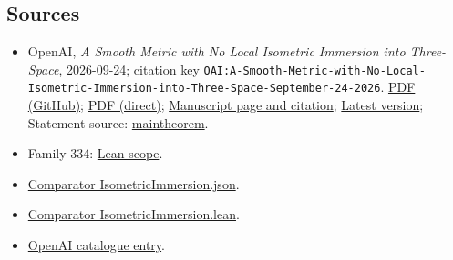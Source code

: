 \documentclass[11pt]{article}
\begin{document}
\subsection{Sources}
\begin{itemize}
\item OpenAI, \emph{A Smooth Metric with No Local Isometric Immersion into Three-Space}, 2026-09-24; citation key \texttt{OAI:A-Smooth-Metric-with-No-Local-Isometric-Immersion-into-Three-Space-September-24-2026}. \href{https://github.com/openai/math/blob/adc7f1241b42e322a6451854ab7e4b4c146bf78a/preprints/A-Smooth-Metric-with-No-Local-Isometric-Immersion-into-Three-Space-September-24-2026/paper.pdf}{PDF (GitHub)}; \href{https://github.com/openai/math/raw/adc7f1241b42e322a6451854ab7e4b4c146bf78a/preprints/A-Smooth-Metric-with-No-Local-Isometric-Immersion-into-Three-Space-September-24-2026/paper.pdf}{PDF (direct)}; \href{https://github.com/openai/math/blob/adc7f1241b42e322a6451854ab7e4b4c146bf78a/preprints/A-Smooth-Metric-with-No-Local-Isometric-Immersion-into-Three-Space-September-24-2026/README.md}{Manuscript page and citation}; \href{https://github.com/openai/math/blob/main/preprints/A-Smooth-Metric-with-No-Local-Isometric-Immersion-into-Three-Space-September-24-2026/paper.pdf}{Latest version}; Statement source: \href{https://github.com/openai/math/blob/adc7f1241b42e322a6451854ab7e4b4c146bf78a/preprints/A-Smooth-Metric-with-No-Local-Isometric-Immersion-into-Three-Space-September-24-2026/build/main.tex\#L70}{maintheorem}.
\item Family 334: \href{https://github.com/openai/math/blob/adc7f1241b42e322a6451854ab7e4b4c146bf78a/lean/docs/334.md}{Lean scope}.
\item \href{https://github.com/openai/math/blob/adc7f1241b42e322a6451854ab7e4b4c146bf78a/lean/ComparatorChallenges/IsometricImmersion.json}{Comparator IsometricImmersion.json}.
\item \href{https://github.com/openai/math/blob/adc7f1241b42e322a6451854ab7e4b4c146bf78a/lean/ComparatorChallenges/IsometricImmersion.lean}{Comparator IsometricImmersion.lean}.
\item \href{https://github.com/openai/math/blob/adc7f1241b42e322a6451854ab7e4b4c146bf78a/CONTENTS.md}{OpenAI catalogue entry}.
\end{itemize}
\end{document}

